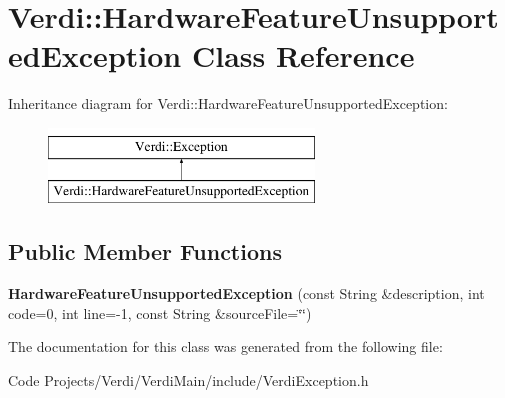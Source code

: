\hypertarget{class_verdi_1_1_hardware_feature_unsupported_exception}{\section{\-Verdi\-:\-:\-Hardware\-Feature\-Unsupported\-Exception \-Class \-Reference}
\label{class_verdi_1_1_hardware_feature_unsupported_exception}
}
\-Inheritance diagram for \-Verdi\-:\-:\-Hardware\-Feature\-Unsupported\-Exception\-:\begin{figure}[H]
\begin{center}
\leavevmode
\includegraphics[height=2.000000cm]{class_verdi_1_1_hardware_feature_unsupported_exception}
\end{center}
\end{figure}
\subsection*{\-Public \-Member \-Functions}
\begin{DoxyCompactItemize}
\item 
\hypertarget{class_verdi_1_1_hardware_feature_unsupported_exception_aa4dd81bfb0487a9868a8663595d1db30}{{\bfseries \-Hardware\-Feature\-Unsupported\-Exception} (const \-String \&description, int code=0, int line=-\/1, const \-String \&source\-File=\char`\"{}\char`\"{})}\label{class_verdi_1_1_hardware_feature_unsupported_exception_aa4dd81bfb0487a9868a8663595d1db30}

\end{DoxyCompactItemize}


\-The documentation for this class was generated from the following file\-:\begin{DoxyCompactItemize}
\item 
\-Code Projects/\-Verdi/\-Verdi\-Main/include/\-Verdi\-Exception.\-h\end{DoxyCompactItemize}
